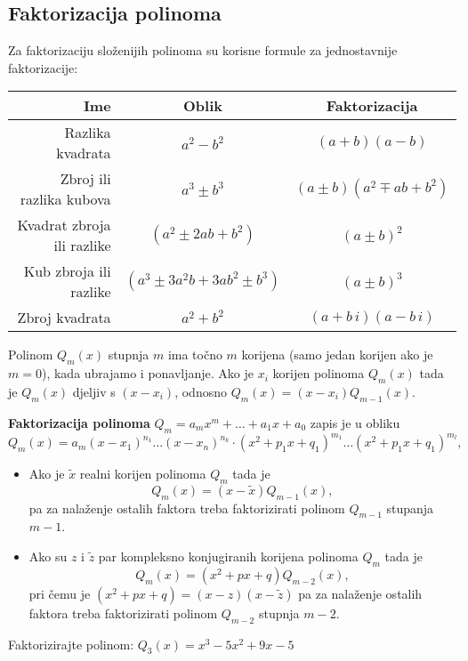 \subsection{Faktorizacija polinoma}

Za faktorizaciju složenijih polinoma su korisne formule za jednostavnije
faktorizacije:

\begin{tabular}{|r|c|c|}
    \hline
    Ime & Oblik & Faktorizacija \\
    \hline
    Razlika kvadrata & $a^2 - b^2$ & $(a+b)(a-b)$ \\
    Zbroj ili razlika kubova & $a^3 \pm b^3$ & $(a \pm b)(a^2 \mp ab + b^2)$ \\
    Kvadrat zbroja ili razlike & $(a^2 \pm 2ab + b^2)$ & $(a \pm b)^2$ \\
    Kub zbroja ili razlike & $(a^3 \pm 3a^2b + 3ab^2 \pm b^3)$ & $(a \pm b)^3$ \\
    \hline
    \hline
    Zbroj kvadrata & $a^2 + b^2$ & $(a+b\,i)(a-b\,i)$ \\
    \hline
\end{tabular}

Polinom $Q_m(x)$ stupnja $m$ ima točno $m$ korijena (samo jedan korijen ako je
$m=0$), kada ubrajamo i ponavljanje. Ako je $x_i$ korijen polinoma $Q_m(x)$ tada
je $Q_m(x)$ djeljiv s $(x-x_i)$, odnosno $Q_m(x) = (x-x_i)Q_{m-1}(x)$.

\textbf{Faktorizacija polinoma} $Q_m=a_mx^m+\dots+a_1x+a_0$ zapis je u obliku
$$
Q_m(x) = a_m(x-x_1)^{n_1}\dots(x-x_n)^{n_k}\cdot(x^2+p_1x+q_1)^{m_1}\dots(x^2+p_1x+q_1)^{m_l},
$$

\begin{itemize}
    \item Ako je $\tilde{x}$ realni korijen polinoma $Q_m$ tada je
    $$
    Q_m(x) = (x-\tilde{x})Q_{m-1}(x),
    $$
    pa za nalaženje ostalih faktora treba faktorizirati polinom $Q_{m-1}$
    stupanja $m-1$.
    \item Ako su $z$ i $\tilde{z}$ par kompleksno konjugiranih korijena polinoma
    $Q_m$ tada je
    $$
    Q_m(x) = (x^2+px+q)Q_{m-2}(x),
    $$
    pri čemu je $(x^2+px+q) = (x-z)(x-\tilde{z})$ pa za nalaženje ostalih
    faktora treba faktorizirati polinom $Q_{m-2}$ stupnja $m-2$.
\end{itemize}

\begin{example}
    Faktorizirajte polinom:
    $Q_3(x) = x^3-5x^2+9x-5$
\end{example}

